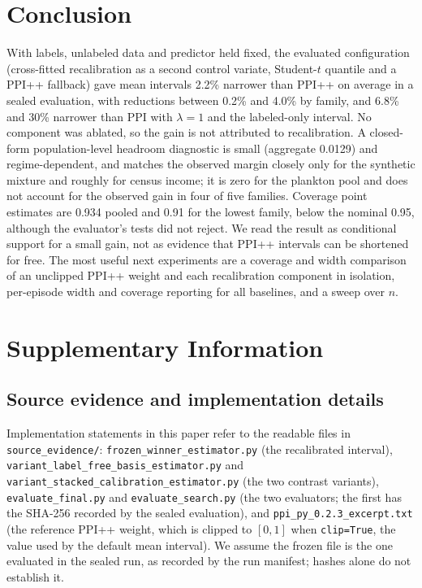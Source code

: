 \documentclass{article}
\begin{document}
\section{Conclusion}
With labels, unlabeled data and predictor held fixed, the evaluated configuration (cross-fitted recalibration as a second control variate, Student-$t$ quantile and a PPI++ fallback) gave mean intervals 2.2\% narrower than PPI++ on average in a sealed evaluation, with reductions between 0.2\% and 4.0\% by family, and 6.8\% and 30\% narrower than PPI with $\lambda{=}1$ and the labeled-only interval. No component was ablated, so the gain is not attributed to recalibration. A closed-form population-level headroom diagnostic is small (aggregate 0.0129) and regime-dependent, and matches the observed margin closely only for the synthetic mixture and roughly for census income; it is zero for the plankton pool and does not account for the observed gain in four of five families. Coverage point estimates are 0.934 pooled and 0.91 for the lowest family, below the nominal 0.95, although the evaluator's tests did not reject. We read the result as conditional support for a small gain, not as evidence that PPI++ intervals can be shortened for free. The most useful next experiments are a coverage and width comparison of an unclipped PPI++ weight and each recalibration component in isolation, per-episode width and coverage reporting for all baselines, and a sweep over $n$.

\clearpage



\clearpage
\appendix
\section{Supplementary Information}

\subsection{Source evidence and implementation details}\label{sec:si-source}
Implementation statements in this paper refer to the readable files in \texttt{source\_evidence/}: \texttt{frozen\_winner\_estimator.py} (the recalibrated interval), \texttt{variant\_label\_free\_basis\_estimator.py} and \texttt{variant\_stacked\_calibration\_estimator.py} (the two contrast variants), \texttt{evaluate\_final.py} and \texttt{evaluate\_search.py} (the two evaluators; the first has the SHA-256 recorded by the sealed evaluation), and \texttt{ppi\_py\_0.2.3\_excerpt.txt} (the reference PPI++ weight, which is clipped to $[0,1]$ when \texttt{clip=True}, the value used by the default mean interval). We assume the frozen file is the one evaluated in the sealed run, as recorded by the run manifest; hashes alone do not establish it.
\end{document}
